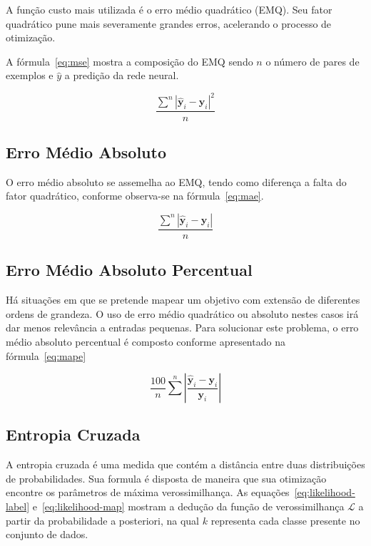A função custo mais utilizada é o erro médio quadrático (EMQ). Seu fator quadrático pune mais severamente grandes erros, acelerando o processo de otimização.

A fórmula~\ref{eq:mse} mostra a composição do EMQ sendo $n$ o número de pares de exemplos e $\hat{y}$ a predição da rede neural.

\begin{equation} \label{eq:mse}
    \frac{\displaystyle\sum^n |\hat{\mathbf{y}}_i - \mathbf{y}_i|^2}{n}
\end{equation}

\subsection{Erro Médio Absoluto}

O erro médio absoluto se assemelha ao EMQ, tendo como diferença a falta do fator quadrático, conforme observa-se na fórmula~\ref{eq:mae}.

\begin{equation} \label{eq:mae}
    \frac{\displaystyle\sum^n |\hat{\mathbf{y}}_i - \mathbf{y}_i|}{n}
\end{equation}

\subsection{Erro Médio Absoluto Percentual}

Há situações em que se pretende mapear um objetivo com extensão de diferentes ordens de grandeza. O uso de erro médio quadrático ou absoluto nestes casos irá dar menos relevância a entradas pequenas. Para solucionar este problema, o erro médio absoluto percentual é composto conforme apresentado na fórmula~\ref{eq:mape}

\begin{equation} \label{eq:mape}
    \frac{100}{n}\sum^n \left|\frac{\hat{\mathbf{y}}_i - \mathbf{y}_i}{\mathbf{y}_i}\right|
\end{equation}

\subsection{Entropia Cruzada}

A entropia cruzada é uma medida que contém a distância entre duas distribuições de probabilidades. Sua formula é disposta de maneira que sua otimização encontre os parâmetros de máxima verossimilhança. As equações~\ref{eq:likelihood-label} e~\ref{eq:likelihood-map} mostram a dedução da função de verossimilhança $\mathcal{L}$ a partir da probabilidade a posteriori, na qual $k$ representa cada classe presente no conjunto de dados.

